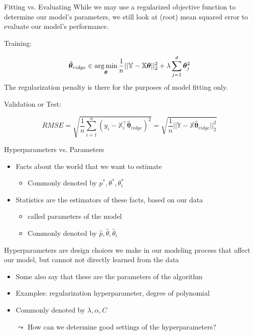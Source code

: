 \documentclass[aspectratio=169]{../latex_main/tntbeamer}  %
\begin{document}
	\begin{frame}{Fitting vs. Evaluating}
	While we may use a regularized objective function to determine our model’s parameters, we still look at (root) mean squared error to evaluate our model’s performance.
    
    \alert{Training:}
    
    \begin{equation*}
	        \hat{\bm{\theta}}_{ridge} \in \operatorname*{arg\,min}_{\bm\theta}\frac{1}{n}||\mathbb{Y} - \mathbb{X}\bm{\theta}||_2^2 + \lambda \sum_{j=1}^d\bm{\theta}_j^2 
    \end{equation*}
    The regularization penalty is there for the purposes of model fitting only.
    
    \bigskip
    \alert{Validation or Test:}
    
    \begin{equation*}
        RMSE = \sqrt{\frac{1}{n}\sum\limits_{i=1}^n(y_i - \mathbb{X}_i^\intercal\hat{\bm\theta}_{ridge})^2} = \sqrt{\frac{1}{n}||\mathbb{Y} - \mathbb{X}\hat{\bm\theta}_{ridge}||_2^2}
    \end{equation*}
	\end{frame}
	
	
	\begin{frame}{Hyperparameters vs. Parameters}
        \begin{itemize}
            \item Facts about the world that we want to estimate
            \begin{itemize}
                \item Commonly denoted by $p^*, \theta^*, \theta^*_i$
            \end{itemize}
            \item Statistics are the estimators of these facts, based on our data
            \begin{itemize}
                \item called \alert{parameters of the model}
                \item Commonly denoted by $\hat{p}, \hat{\theta}, \hat{\theta}_i$
            \end{itemize}
        \end{itemize}
        \bigskip
        \alert{Hyperparameters} are design choices we make in our modeling process that affect our model, but cannot not directly learned from the data

        \begin{itemize}
            \item Some also say that these are the \alert{parameters of the algorithm} 
            \item Examples: regularization hyperparameter, degree of polynomial
            \item Commonly denoted by $\lambda, \alpha, C$
            \item[$\leadsto$] How can we determine good settings of the hyperparameters?
        \end{itemize}
        
	\end{frame}
\end{document}
